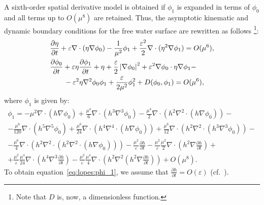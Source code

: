 A sixth-order spatial derivative model is obtained if
$\phi_1$ is expanded in terms of $\phi_0$ and all terms up
to $O(\mu^8)$ are retained.  Thus, the asymptotic kinematic
and dynamic boundary conditions for the free water surface
are rewritten as follows \footnote{Note that $D$
is, now, a  dimensionless function.}:
\begin{subequations}\label{eq:lopes:kindyn}
\begin{align}
&\displaystyle\frac{\partial \eta}{\partial t}+\varepsilon\nabla\cdot(\eta\nabla\phi_0)-\frac{1}{\mu^2}\phi_1+
  \frac{\varepsilon^2}{2}\nabla\cdot(\eta^2\nabla\phi_1)=O(\mu^{6}),
\vspace{0.3cm}\\ &\displaystyle
\frac{\partial \phi_0}{\partial t}+\varepsilon\eta\frac{\partial \phi_1}{\partial t}+\eta +
\frac{\varepsilon}{2}
\left|\nabla\phi_0\right|^2+\varepsilon^2\nabla\phi_0\cdot\eta\nabla\phi_1-\nonumber
\\ & \displaystyle \qquad
-\varepsilon^2\eta\nabla^2\phi_0\phi_1
+\frac{\varepsilon}{2\mu^2}\phi_1^2
+D(\phi_0,\phi_1)
=O(\mu^{6}),
\end{align}
\end{subequations}
where $\phi_1$ is given by:
\begin{multline}\label{eq:lopes:phi_1}
\phi_1= -\mu^{2}\nabla\cdot\left(h\nabla\phi_0\right)
+\frac{\mu^{4}}{6}\nabla\cdot\left(h^3\nabla^3\phi_0\right)
-\frac{\mu^{4}}{2}\nabla\cdot\left(h^2
\nabla^2\cdot\left(h\nabla\phi_0\right)
\right)-\\ -\frac{\mu^6}{120}\nabla\cdot\left(h^5\nabla^5\phi_0\right)+
\frac{\mu^6}{24}\nabla\cdot\left(h^4\nabla^4\cdot\left(h\nabla\phi_0\right)\right)+\frac{\mu^6}{12}\nabla\cdot\left(h^2\nabla^2\cdot\left(h^3\nabla^3\phi_0\right)\right)-\\ -\frac{\mu^6}{4}\nabla\cdot\left(h^2\nabla^2\cdot\left(h^2\nabla^2\cdot\left(h\nabla\phi_0\right)\right)\right)
-\frac{\mu^2}{\varepsilon}\frac{\partial h}{\partial t}-
\frac{\mu^2}{\varepsilon}\frac{\mu^2}{2}\nabla\cdot\left(h^2\nabla\frac{\partial h}{\partial t}\right)+\\ +\frac{\mu^2}{\varepsilon}\frac{\mu^4}{24}\nabla\cdot\left(h^4\nabla^3
\frac{\partial h}{\partial t}\right)
-\frac{\mu^2}{\varepsilon}\frac{\mu^4}{4}\nabla\cdot\left(h^2\nabla^2\left(h^2\nabla\frac{\partial h}{\partial t}\right)\right)+O(\mu^{8}).
\end{multline}
To obtain equation~\eqref{eq:lopes:phi_1}, we assume that
$\displaystyle\frac{\partial h}{\partial t}=O(\varepsilon)$
(cf.~\cite{DutykhDias2007}).

